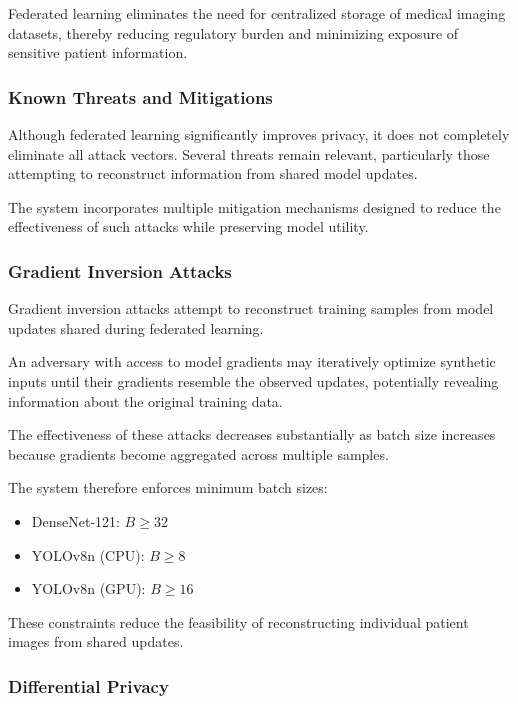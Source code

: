Federated learning eliminates the need for centralized storage of medical imaging datasets, thereby reducing regulatory burden and minimizing exposure of sensitive patient information.

\subsubsection{Known Threats and Mitigations}

Although federated learning significantly improves privacy, it does not completely eliminate all attack vectors. Several threats remain relevant, particularly those attempting to reconstruct information from shared model updates.

The system incorporates multiple mitigation mechanisms designed to reduce the effectiveness of such attacks while preserving model utility.

\subsubsection{Gradient Inversion Attacks}

Gradient inversion attacks attempt to reconstruct training samples from model updates shared during federated learning.

An adversary with access to model gradients may iteratively optimize synthetic inputs until their gradients resemble the observed updates, potentially revealing information about the original training data.

The effectiveness of these attacks decreases substantially as batch size increases because gradients become aggregated across multiple samples.

The system therefore enforces minimum batch sizes:

\begin{itemize}
	\item DenseNet-121: $B \ge 32$
	\item YOLOv8n (CPU): $B \ge 8$
	\item YOLOv8n (GPU): $B \ge 16$
\end{itemize}

These constraints reduce the feasibility of reconstructing individual patient images from shared updates.

\subsubsection{Differential Privacy}


